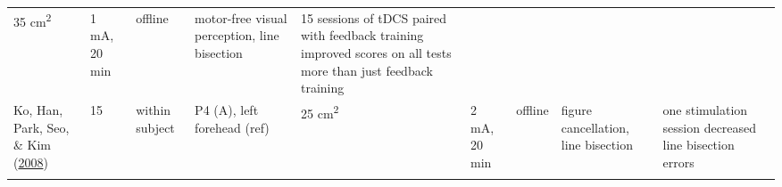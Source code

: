 \documentclass[11pt,]{memoir}
\begin{document}
\begin{longtable}[]{@{}lllllllll@{}}
\begin{minipage}[t]{0.03\columnwidth}
35
cm\textsuperscript{2}\strut
\end{minipage} & \begin{minipage}[t]{0.05\columnwidth}\raggedright
1 mA, 20
min\strut
\end{minipage} & \begin{minipage}[t]{0.04\columnwidth}\raggedright
offline\strut
\end{minipage} & \begin{minipage}[t]{0.15\columnwidth}\raggedright
motor-free visual perception, line
bisection\strut
\end{minipage} & \begin{minipage}[t]{0.24\columnwidth}\raggedright
15 sessions of tDCS paired with feedback training improved
scores on all tests more than just feedback training\strut
\end{minipage}\tabularnewline
\begin{minipage}[t]{0.09\columnwidth}\raggedright
Ko, Han, Park, Seo, \& Kim (\protect\hyperlink{ref-Ko2008}{2008})\strut
\end{minipage} & \begin{minipage}[t]{0.02\columnwidth}\raggedright
15\strut
\end{minipage} & \begin{minipage}[t]{0.04\columnwidth}\raggedright
within
subject\strut
\end{minipage} & \begin{minipage}[t]{0.10\columnwidth}\raggedright
P4 (A), left forehead
(ref)\strut
\end{minipage} & \begin{minipage}[t]{0.03\columnwidth}\raggedright
25
cm\textsuperscript{2}\strut
\end{minipage} & \begin{minipage}[t]{0.05\columnwidth}\raggedright
2 mA, 20
min\strut
\end{minipage} & \begin{minipage}[t]{0.04\columnwidth}\raggedright
offline\strut
\end{minipage} & \begin{minipage}[t]{0.15\columnwidth}\raggedright
figure cancellation, line bisection\strut
\end{minipage} & \begin{minipage}[t]{0.24\columnwidth}\raggedright
one stimulation session decreased line bisection errors\strut
\end{minipage}\tabularnewline
\begin{minipage}[t]{0.09\columnwidth}\raggedright

\end{minipage}
\end{longtable}
\end{document}
